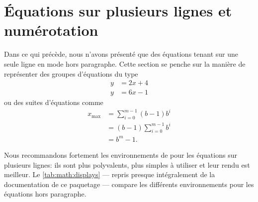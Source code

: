 \section{Équations sur plusieurs lignes et numérotation}
\label{sec:math:align}

Dans ce qui précède, nous n'avons présenté que des équations tenant
sur une seule ligne en mode hors paragraphe. Cette section se penche
sur la manière de représenter des groupes d'équations du type
\begin{align}
  y &= 2x + 4 \\
  y &= 6x - 1
\end{align}
ou des suites d'équations comme
\begin{align*}
  x_{\text{max}}
  &= \sum_{i = 0}^{m - 1} (b - 1) b^i \\
  &= (b - 1) \sum_{i = 0}^{m - 1} b^i \\
  &= b^m - 1.
\end{align*}

Nous recommandons fortement les environnements de  pour
les équations sur plusieurs lignes: ils sont plus polyvalents, plus
simples à utiliser et leur rendu est meilleur. Le
\autoref{tab:math:displays} --- repris presque intégralement de la
documentation de ce paquetage --- compare les différents
environnements pour les équations hors paragraphe.

